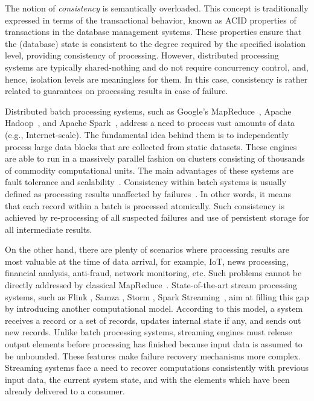 
\label {fs-intro-seciton}

The notion of {\em consistency} is semantically overloaded. This concept is traditionally expressed in terms of the transactional behavior, known as ACID properties of transactions in the database management systems. These properties ensure that the (database) state is consistent to the degree required by the specified isolation level, providing consistency of processing. However, distributed processing systems are typically shared-nothing and do not require concurrency control, and, hence, isolation levels are meaningless for them. In this case, consistency is rather related to guarantees on processing results in case of failure.

Distributed batch processing systems, such as Google's MapReduce~\cite{Dean:2008:MSD:1327452.1327492}, Apache Hadoop~\cite{hadoop2009hadoop}, and Apache Spark~\cite{Zaharia:2016:ASU:3013530.2934664}, address a need to process vast amounts of data (e.g., Internet-scale). The fundamental idea behind them is to independently process large data blocks that are collected from static datasets. These engines are able to run in a massively parallel fashion on clusters consisting of thousands of commodity computational units. The main advantages of these systems are fault tolerance and scalability~\cite{borthakur2011apache}. Consistency within batch systems is usually defined as processing results unaffected by failures~\cite{Zaharia:2012:DSE:2342763.2342773}. In other words, it means that each record within a batch is processed atomically. Such consistency is achieved by re-processing of all suspected failures and use of persistent storage for all intermediate results.

On the other hand, there are plenty of scenarios where processing results are most valuable at the time of data arrival, for example, IoT, news processing, financial analysis, anti-fraud, network monitoring, etc. Such problems cannot be directly addressed by classical MapReduce~\cite{Doulkeridis:2014:SLA:2628707.2628782}. State-of-the-art stream processing systems, such as Flink \cite{carbone2015apache}, Samza \cite{Noghabi:2017:SSS:3137765.3137770}, Storm \cite{apache:storm}, Spark Streaming~\cite{Zaharia:2012:DSE:2342763.2342773}, aim at filling this gap by introducing another computational model. According to this model, a system receives a record or a set of records, updates internal state if any, and sends out new records. Unlike batch processing systems, streaming engines must release output elements before processing has finished because input data is assumed to be unbounded. These features make failure recovery mechanisms more complex. Streaming systems face a need to recover computations consistently with previous input data, the current system state, and with the elements which have been already delivered to a consumer.

